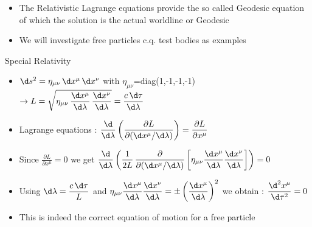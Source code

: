 \begin{itemize}
\item The Relativistic Lagrange equations provide the so called {\blue Geodesic equation}\\
      of which the solution is the actual worldline or Geodesic
\item[] We will investigate free particles c.q. test bodies as examples
\end{itemize}
%
\begin{center}
{\blue Special Relativity}
\end{center}
%
\begin{itemize}
\item $\d s^{2}=\eta_{\mu \nu}\, \d x^{\mu}\, \d x^{\nu}$ with $\eta_{\mu\nu}$=diag(1,-1,-1,-1)
      $\displaystyle \rightarrow L=\sqrt{\eta_{\mu \nu}\, \frac{\d x^{\mu}}{\d \lambda}\, \frac{\d x^{\nu}}{\d \lambda}}=
       \frac{c\,\d\tau}{\d\lambda}$
\item Lagrange equations :
      $\displaystyle \frac{\d}{\d \lambda}\left(\frac{\partial L}{\partial(\d x^{\mu}/\d \lambda)}\right)=
       \frac{\partial L}{\partial x^{\mu}}$
\item[] Since $\displaystyle \frac{\partial L}{\partial x^{\mu}}=0$ we get
        $\displaystyle \frac{\d}{\d \lambda}\left(\frac{1}{2L}\,
        \frac{\partial}{\partial(\d x^{\mu}/\d \lambda)}
        \left[\eta_{\mu\nu}\frac{\d x^{\mu}}{\d \lambda}\frac{\d x^{\nu}}{\d \lambda}\right]\right)=0$
\item[] Using $\displaystyle \d\lambda=\frac{c\,\d\tau}{L}$
        and $\displaystyle \eta_{\mu\nu}\frac{\d x^{\mu}}{\d \lambda}\frac{\d x^{\nu}}{\d \lambda}=
        \pm \left(\frac{\d x^{\mu}}{\d\lambda}\right)^{2}$
        we obtain : {\blue $\displaystyle \frac{\d^{2} x^{\mu}}{\d\tau^{2}}=0$}
\item {\red This is indeed the correct equation of motion for a free particle}
\end{itemize}

